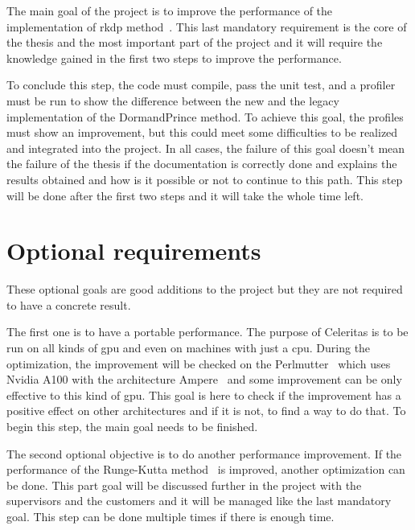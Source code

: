 The main goal of the project is to improve the performance of the implementation of \acrfull{rkdp} method~\cite{princeDormand}.
This last mandatory requirement is the core of the thesis and the most important part of the project and it will require the knowledge gained in the first two steps to improve the performance.

To conclude this step, the code must compile, pass the unit test, and a profiler must be run to show the difference between the new and the legacy implementation of the DormandPrince method.
To achieve this goal, the profiles must show an improvement, but this could meet some difficulties to be realized and integrated into the project.
In all cases, the failure of this goal doesn't mean the failure of the thesis if the documentation is correctly done and explains the results obtained and how is it possible or not to continue to this path.
This step will be done after the first two steps and it will take the whole time left.

\section{Optional requirements}
\label{ch:introduction:optional-requirements}

These optional goals are good additions to the project but they are not
required to have a concrete result.

The first one is to have a portable performance.
The purpose of Celeritas is to be run on all kinds of \acrshort{gpu} and even on machines with just a \acrshort{cpu}.
During the optimization, the improvement will be checked on the Perlmutter~\cite{Perlmutter} which uses Nvidia A100 with the architecture Ampere~\cite{ampere} and some improvement can be only effective to this kind of \acrshort{gpu}.
This goal is here to check if the improvement has a positive effect on other architectures and if it is not, to find a way to do that.
To begin this step, the main goal needs to be finished.

The second optional objective is to do another performance improvement.
If the performance of the Runge-Kutta method~\cite{Runge-Kutta-methods} is improved, another optimization can be done.
This part goal will be discussed further in the project with the supervisors and the customers and it will be managed like the last mandatory goal.
This step can be done multiple times if there is enough time.
